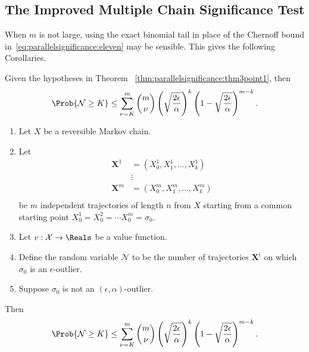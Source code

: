 \documentclass[12pt]{article}
\begin{document}
\subsection*{The Improved Multiple Chain Significance Test}


\begin{remark}
    When \( m \) is not large, using the exact binomial tail in place of
    the Chernoff bound in~\eqref{eq:parallelsignificance:eleven} may be
    sensible.  This gives the following Corollaries.
\end{remark}

\begin{corollary}
    Given the hypotheses in Theorem~%
    \ref{thm:parallelsignificance:thm3point1}, then
    \[
        \Prob{\mathcal{N} \ge K} \le \sum\limits_{\nu=K}^m \binom{m}{\nu}
        \left( \sqrt{\frac{2\epsilon}{\alpha}} \right)^{k} \left( 1 -
        \sqrt{\frac{2\epsilon}{\alpha}} \right)^{m-k}.
    \]
\end{corollary}


\begin{corollary}
    \begin{enumerate}
        \item
            Let \( X \) be a reversible Markov chain.
        \item
            Let
            \begin{align*}
                \mathbf{X}^1 &= (X_0^1, X_1^1, \dots, X_k^1 )\\
                &\vdots \\
                \mathbf{X}^m &= (X_0^m, X_1^m, \dots, X_k^m )\\
            \end{align*}
            be \( m \) independent trajectories of length \( n \) from \(
            X \) starting from a common starting point \( X_0^1 = X_0^2
            = \cdots X_0^m = \sigma_0 \).
        \item
            Let \( v :  \mathcal{X} \to \Reals \) be a value function.
        \item
            Define the random variable \( \mathcal{N} \) to be the
            number of trajectories \( \mathbf{X}^i \) on which \( \sigma_0
            \) is an \( \epsilon \)-outlier.
        \item
            Suppose \( \sigma_0 \) is not an \( (\epsilon, \alpha) \)-outlier.
    \end{enumerate}
    Then
    \[
        \Prob{\mathcal{N} \ge K} \le \sum\limits_ {\nu=K}^m \binom{m}{\nu}
        \left( \sqrt{\frac{2\epsilon} {\alpha}} \right)^k \left( 1 - \sqrt{\frac
        {2\epsilon}{\alpha}} \right)^ {m-k}.
    \]
\end{corollary}
\end{document}
